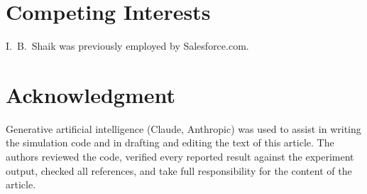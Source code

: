 \documentclass[11pt]{article}
\begin{document}
\section*{Competing Interests}
I.~B.~Shaik was previously employed by Salesforce.com.

\section*{Acknowledgment}
Generative artificial intelligence (Claude, Anthropic) was used to assist in writing the simulation code and in drafting and editing the text of this article. The authors reviewed the code, verified every reported result against the experiment output, checked all references, and take full responsibility for the content of the article.



\end{document}
